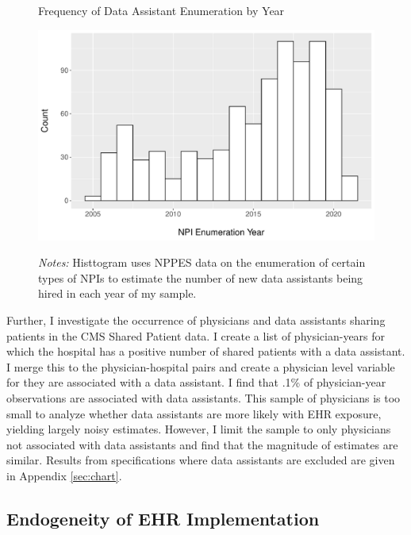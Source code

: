 \documentclass[12pt]{article}
\begin{document}
\begin{figure}[t]
\centering
\captionsetup{width=.5\linewidth}
\caption{Frequency of Data Assistant Enumeration by Year}
\includegraphics[scale=.5]{Objects/dataassistant_histogram.pdf}
\label{fig:dataassistant_histogram}
\vspace{2mm}
    \caption*{\footnotesize{\textit{Notes:} Histtogram uses NPPES data on the enumeration of certain types of NPIs to estimate the number of new data assistants being hired in each year of my sample.}}
\end{figure}

Further, I investigate the occurrence of physicians and data assistants sharing patients in the CMS Shared Patient data. I create a list of physician-years for which the hospital has a positive number of shared patients with a data assistant. I merge this to the physician-hospital pairs and create a physician level variable for they are associated with a data assistant. I find that .1\% of physician-year observations are associated with data assistants. This sample of physicians is too small to analyze whether data assistants are more likely with EHR exposure, yielding largely noisy estimates. However, I limit the sample to only physicians not associated with data assistants and find that the magnitude of estimates are similar. Results from specifications where data assistants are excluded are given in Appendix \ref{sec:chart}.

\subsection{Endogeneity of EHR Implementation}\label{sec:endogeneity}
\end{document}
